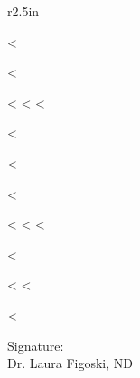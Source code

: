 \documentclass{NDChart}
\begin{document}
\begin{wrapfigure}{r}{2.5in}

  \begin{sidebox}[frametitle={Problem List}]
    <%
    \begin{boxitemize}
      \raggedright
      <%
        \item <%
              <%
      <%
    \end{boxitemize}
    <%
  \end{sidebox}

  \vspace*{11pt}

  \begin{sidebox}[frametitle={Currently Taking}]
    <%
    \begin{boxitemize}
      \raggedright
      <%
        \item <%
              <%
      <%
    \end{boxitemize}
    <%
  \end{sidebox}

\end{wrapfigure}

\nullspace

<%
<%

<%

\vfill
\begin{flushright}
Signature: \underline{\hspace{2.5in}}\\
Dr. Laura Figoski, ND
\end{flushright}
\end{document}
